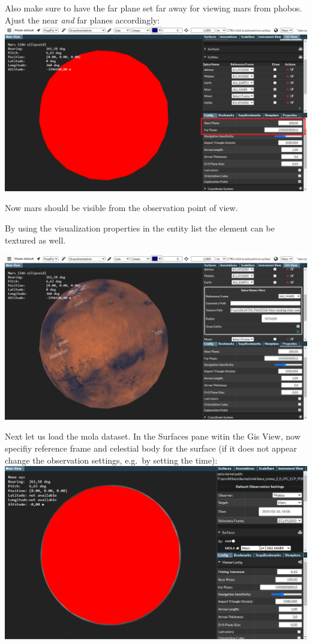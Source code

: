 Also make sure to have the far plane set far away for viewing mars from
phobos. Ajust the near \emph{and} far planes accordingly:
\includegraphics{./images/farplane.png}

Now mars should be visible from the observation point of view.

By using the visualization properties in the entity list the element can
be textured as well.

\includegraphics{./images/textured.png}

Next let us load the mola dataset. In the Surfaces pane witin the Gis
View, now specifiy reference frame and celestial body for the surface
(if it does not appear change the observation settings, e.g.~by setting
the time): \includegraphics{images/surfaceRefFrame.png}

